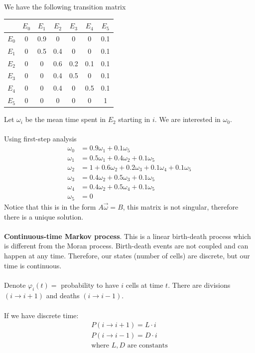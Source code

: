 \documentclass[12pt, letterpaper]{article}
\begin{document}
We have the following transition matrix
\begin{center}
    \begin{tabular}{c | c | c | c | c | c | c}
    & $E_0$ & $E_1$ & $E_2$ & $E_3$ & $E_4$ & $E_5$ \\
    \hline
    $E_0$ & 0 & 0.9 & 0 & 0 & 0 & 0.1 \\
    \hline
    $E_1$ & 0 & 0.5 & 0.4 & 0 & 0 & 0.1 \\
    \hline
    $E_2$ & 0 & 0 & 0.6 & 0.2 & 0.1 & 0.1 \\
    \hline
    $E_3$ & 0 & 0 & 0.4 & 0.5 & 0 & 0.1 \\
    \hline
    $E_4$ & 0 & 0 & 0.4 & 0 & 0.5 & 0.1\\
    \hline
    $E_5$ & 0 & 0 & 0 & 0 & 0 & 1 
    \end{tabular}
\end{center}
Let $\omega_i$ be the mean time spent in $E_2$ starting in $i$. We are interested in $\omega_0$. \\ \\
Using first-step analysis
\begin{align*}
    \omega_0 &= 0.9\omega_1 + 0.1\omega_5 \\
    \omega_1 &= 0.5\omega_1 + 0.4\omega_2 + 0.1\omega_5  \\
    \omega_2 &= 1 + 0.6\omega_2 + 0.2\omega_3 + 0.1\omega_4 + 0.1\omega_5  \\
    \omega_3 &= 0.4\omega_2 + 0.5\omega_3 + 0.1\omega_5 \\
    \omega_4 &= 0.4\omega_2 + 0.5\omega_4 + 0.1\omega_5 \\
    \omega_5 &= 0 
\end{align*}
Notice that this is in the form $A\vec \omega = B$, this matrix is not singular, therefore there
is a unique solution. \\\\
\textbf{Continuous-time Markov process}. This is a linear birth-death process which is different
from the Moran process. Birth-death events are not coupled and can happen at any time. Therefore, 
our states (number of cells) are discrete, but our time is continuous. \\ \\
Denote $\varphi_i(t) = $ probability to have $i$ cells at time $t$. There are divisions 
$(i\rightarrow i+1)$ and deaths $(i\rightarrow i-1)$. \\ \\
If we have discrete time:
\begin{align*}
    P(i\rightarrow i+1) = L\cdot i \\
    P(i\rightarrow i-1) = D\cdot i \\
    \text{where } L,D \text{ are constants}
\end{align*}
\end{document}
